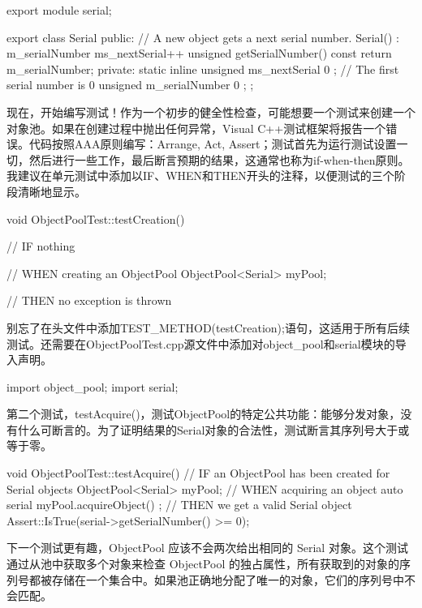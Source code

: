 \begin{cpp}
export module serial;

export class Serial
{
    public:
        // A new object gets a next serial number.
        Serial() : m_serialNumber { ms_nextSerial++ } { }
        unsigned getSerialNumber() const { return m_serialNumber; }
    private:
        static inline unsigned ms_nextSerial { 0 }; // The first serial number is 0
        unsigned m_serialNumber { 0 };
};
\end{cpp}

现在，开始编写测试！作为一个初步的健全性检查，可能想要一个测试来创建一个对象池。如果在创建过程中抛出任何异常，Visual C++测试框架将报告一个错误。代码按照AAA原则编写：Arrange, Act, Assert；测试首先为运行测试设置一切，然后进行一些工作，最后断言预期的结果，这通常也称为if-when-then原则。我建议在单元测试中添加以IF、WHEN和THEN开头的注释，以便测试的三个阶段清晰地显示。

\begin{cpp}
void ObjectPoolTest::testCreation()
{
    // IF nothing

    // WHEN creating an ObjectPool
    ObjectPool<Serial> myPool;

    // THEN no exception is thrown
}
\end{cpp}

别忘了在头文件中添加TEST\_METHOD(testCreation);语句，这适用于所有后续测试。还需要在ObjectPoolTest.cpp源文件中添加对object\_pool和serial模块的导入声明。

\begin{cpp}
import object_pool;
import serial;
\end{cpp}

第二个测试，testAcquire()，测试ObjectPool的特定公共功能：能够分发对象，没有什么可断言的。为了证明结果的Serial对象的合法性，测试断言其序列号大于或等于零。

\begin{cpp}
void ObjectPoolTest::testAcquire()
{
    // IF an ObjectPool has been created for Serial objects
    ObjectPool<Serial> myPool;
    // WHEN acquiring an object
    auto serial { myPool.acquireObject() };
    // THEN we get a valid Serial object
    Assert::IsTrue(serial->getSerialNumber() >= 0);
}
\end{cpp}

下一个测试更有趣，ObjectPool 应该不会两次给出相同的 Serial 对象。这个测试通过从池中获取多个对象来检查 ObjectPool 的独占属性，所有获取到的对象的序列号都被存储在一个集合中。如果池正确地分配了唯一的对象，它们的序列号中不会匹配。

